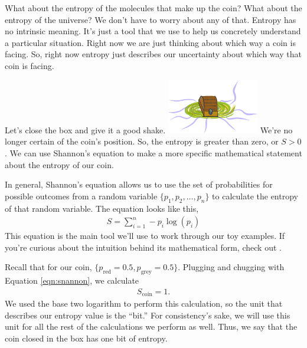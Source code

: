 What about the entropy of the molecules that make up the coin?
What about the entropy of the universe?
We don't have to worry about any of that.
Entropy has no intrinsic meaning.
It's just a tool that we use to help us concretely understand a particular situation.
Right now we are just thinking about which way a coin is facing.
So, right now entropy just describes our uncertainty about which way that coin is facing.

Let's close the box and give it a good shake.
\includegraphics[width=0.3\textwidth]{img/big-box-closed-portal}
We're no longer certain of the coin's position.
So, the entropy is greater than zero, or $S > 0$.
We can use Shannon's equation to make a more specific mathematical statement about the entropy of our coin.

In general, Shannon's equation allows us to use the set of probabilities for possible outcomes from a random variable $\{p_1, p_2, \ldots, p_n\}$ to calculate the entropy of that random variable.
The equation looks like this,
\begin{align} \label{eqn:shannon}
S = \sum_{i=1}^{n} -p_i \log(p_i)
\end{align}
This equation is the main tool we'll use to work through our toy examples.
If you're curious about the intuition behind its mathematical form, check out \cite{Adami2016}.

Recall that for our coin, $\{p_{\text{red}} = 0.5, p_{\text{grey}} = 0.5 \}$.
Plugging and chugging with Equation \ref{eqn:snannon}, we calculate
\begin{align*}
S_{\text{coin}} = 1.
\end{align*}
We used the base two logarithm to perform this calculation, so the unit that describes our entropy value is the ``bit.''
For consistency's sake, we will use this unit for all the rest of the calculations we perform as well.
Thus, we say that the coin closed in the box has one bit of entropy.


